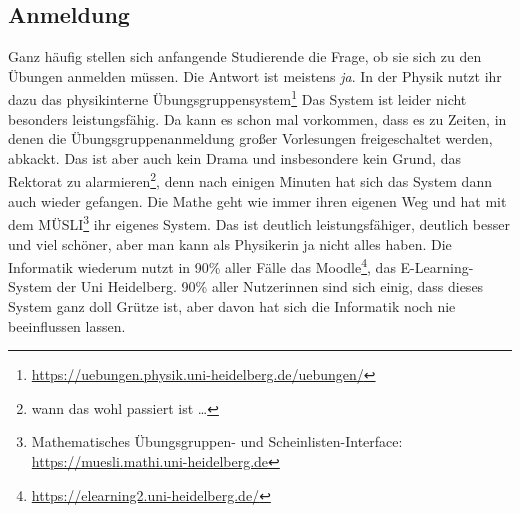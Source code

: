 \subsection{Anmeldung}
Ganz häufig stellen sich anfangende Studierende die Frage, ob sie sich zu den Übungen anmelden müssen. Die Antwort ist meistens \emph{ja}. In der Physik nutzt ihr dazu das physikinterne Übungsgruppensystem\footnote{\url{https://uebungen.physik.uni-heidelberg.de/uebungen/}} Das System ist leider nicht besonders leistungsfähig. Da kann es schon mal vorkommen, dass es zu Zeiten, in denen die Übungsgruppenanmeldung großer Vorlesungen freigeschaltet werden, abkackt. Das ist aber auch kein Drama und insbesondere kein Grund, das Rektorat zu alarmieren\footnote{wann das wohl passiert ist \dots}, denn nach einigen Minuten hat sich das System dann auch wieder gefangen. Die Mathe geht wie immer ihren eigenen Weg  und hat mit dem MÜSLI\footnote{Mathematisches Übungsgruppen- und Scheinlisten-Interface: \url{https://muesli.mathi.uni-heidelberg.de}} ihr eigenes System. Das ist deutlich leistungsfähiger, deutlich besser und viel schöner, aber man kann als Physikerin ja nicht alles haben. Die Informatik wiederum nutzt in 90\% aller Fälle das Moodle\footnote{\url{https://elearning2.uni-heidelberg.de/}}, das E-Learning-System der Uni Heidelberg. 90\% aller Nutzerinnen sind sich einig, dass dieses System ganz doll Grütze ist, aber davon hat sich die Informatik noch nie beeinflussen lassen.
